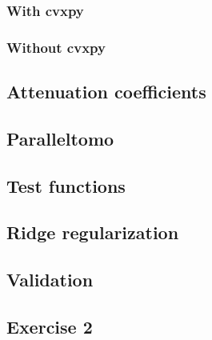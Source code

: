 \documentclass{article}
\begin{document}
\subsubsection{With cvxpy}\label{appendix:exercise-1-cvxpy}


\subsubsection{Without cvxpy}\label{appendix:exercise-1}


\subsection{Attenuation coefficients}\label{appendix:attenuation-coefficients}


\subsection{Paralleltomo}\label{appendix:paralleltomo}


\subsection{Test functions}\label{appendix:generate-test-functions}


\subsection{Ridge regularization}\label{appendix:ridge-regularization}


\subsection{Validation}\label{appendix:validation}


\subsection{Exercise 2}\label{appendix:exercise-2}

\end{document}
